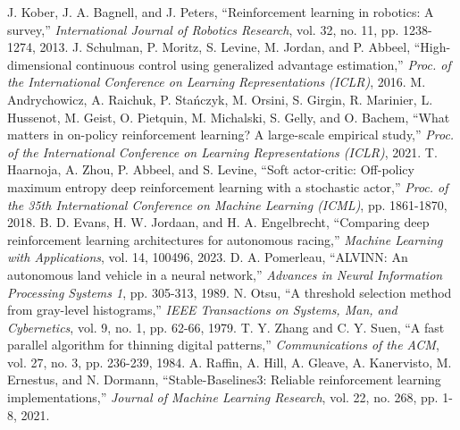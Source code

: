 \documentclass{IJCAS}
\begin{document}
\begin{reference}
 J. Kober, J. A. Bagnell, and J. Peters, ``Reinforcement learning in robotics: A survey,'' \textit{International Journal of Robotics Research}, vol. 32, no. 11, pp. 1238-1274, 2013.
 J. Schulman, P. Moritz, S. Levine, M. Jordan, and P. Abbeel, ``High-dimensional continuous control using generalized advantage estimation,'' \textit{Proc. of the International Conference on Learning Representations (ICLR)}, 2016.
 M. Andrychowicz, A. Raichuk, P. Sta\'nczyk, M. Orsini, S. Girgin, R. Marinier, L. Hussenot, M. Geist, O. Pietquin, M. Michalski, S. Gelly, and O. Bachem, ``What matters in on-policy reinforcement learning? A large-scale empirical study,'' \textit{Proc. of the International Conference on Learning Representations (ICLR)}, 2021.
 T. Haarnoja, A. Zhou, P. Abbeel, and S. Levine, ``Soft actor-critic: Off-policy maximum entropy deep reinforcement learning with a stochastic actor,'' \textit{Proc. of the 35th International Conference on Machine Learning (ICML)}, pp. 1861-1870, 2018.
 B. D. Evans, H. W. Jordaan, and H. A. Engelbrecht, ``Comparing deep reinforcement learning architectures for autonomous racing,'' \textit{Machine Learning with Applications}, vol. 14, 100496, 2023.
 D. A. Pomerleau, ``ALVINN: An autonomous land vehicle in a neural network,'' \textit{Advances in Neural Information Processing Systems 1}, pp. 305-313, 1989.
 N. Otsu, ``A threshold selection method from gray-level histograms,'' \textit{IEEE Transactions on Systems, Man, and Cybernetics}, vol. 9, no. 1, pp. 62-66, 1979.
 T. Y. Zhang and C. Y. Suen, ``A fast parallel algorithm for thinning digital patterns,'' \textit{Communications of the ACM}, vol. 27, no. 3, pp. 236-239, 1984.
 A. Raffin, A. Hill, A. Gleave, A. Kanervisto, M. Ernestus, and N. Dormann, ``Stable-Baselines3: Reliable reinforcement learning implementations,'' \textit{Journal of Machine Learning Research}, vol. 22, no. 268, pp. 1-8, 2021.
\end{reference}
\end{document}
